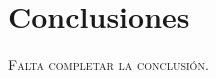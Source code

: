\section{Conclusiones}\label{concluisiones}
\thispagestyle{plain}

\divider

{\scshape\Large\Bold Falta completar la conclusión.}\\

\lipsum[1]\\

\lipsum[2]\\

\lipsum[3]\\

\afterpage{\blankpage}\newpage